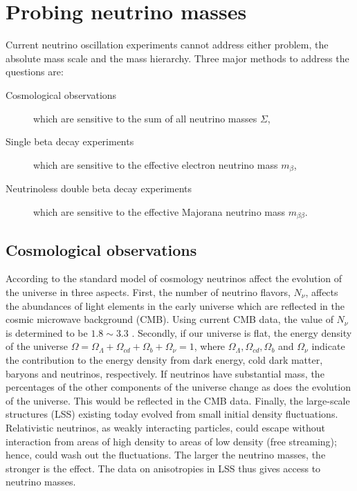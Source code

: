 \section{Probing neutrino masses}
\label{sec:pnm}
Current neutrino oscillation experiments cannot address either problem, the absolute mass scale and the mass hierarchy. Three major methods to address the questions are:
\begin{description}
\item[Cosmological observations] which are sensitive to the sum of all neutrino masses $\Sigma$,
\item[Single beta decay experiments] which are sensitive to the   effective electron neutrino mass $m_{\beta}$,
\item[Neutrinoless double beta decay experiments] which are sensitive   to the effective Majorana neutrino mass $m_{\beta\beta}$.
\end{description}

\subsection{Cosmological observations}
\label{sec:coob}
According to the standard model of cosmology neutrinos affect the evolution of the universe in three aspects. First, the number of neutrino flavors, $N_{\nu}$, affects the abundances of light elements in the early universe which are reflected in the cosmic microwave background (CMB). Using current CMB data, the value of $N_{\nu}$ is determined to be $1.8 \sim 3.3$ \cite{Oli02}. Secondly, if our universe is flat, the energy density of the universe $\Omega = \Omega_{\Lambda} + \Omega_{cd} + \Omega_{b} + \Omega_{\nu} = 1$, where $\Omega_{\Lambda}, \Omega_{cd}, \Omega_{b}$ and $\Omega_{\nu}$ indicate the contribution to the energy density from dark energy, cold dark matter, baryons and neutrinos, respectively. If neutrinos have substantial mass, the percentages of the other components of the universe change as does the evolution of the universe. This would be reflected in the CMB data. Finally, the large-scale structures (LSS) existing today evolved from small initial density fluctuations. Relativistic neutrinos, as weakly interacting particles, could escape without interaction from areas of high density to areas of low density (free streaming); hence, could wash out the  fluctuations. The larger the neutrino masses, the stronger is the effect. The data on anisotropies in LSS thus gives access to neutrino masses. 

